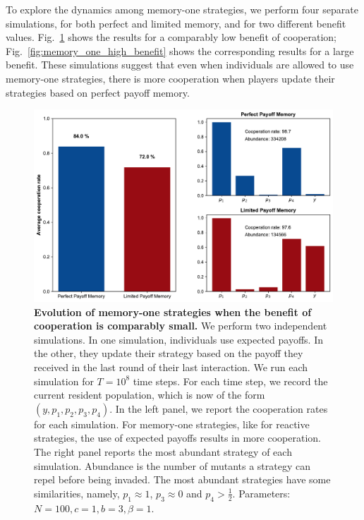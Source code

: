 \documentclass[11pt]{article}
\theoremstyle{plainCl1}
\theoremstyle{plainCl2}
\begin{document}
To explore the dynamics among memory-one strategies, we perform four separate simulations, for both perfect and limited memory, and for two different benefit values. 
Fig.~\ref{fig:memory_one_low_benefit} shows the results for a comparably low benefit of cooperation; 
Fig.~\ref{fig:memory_one_high_benefit} shows the corresponding results for a large benefit. 
These simulations suggest that even when individuals
are allowed to use memory-one strategies, there is more cooperation when players update their strategies based on perfect payoff memory. 

\begin{figure}[!htbp]
  \centering 
  \includegraphics[width=\textwidth]{static/memory_one_results_low_benefit.pdf}
  \caption{\textbf{Evolution of memory-one strategies when the benefit of cooperation is comparably small.}
  We perform two independent simulations. In one simulation, individuals use
  expected payoffs. 
  In the other, they update their strategy based on the payoff they received in the last round of their last interaction. 
  We run each simulation for \(T = 10^8\) time steps.
  For each time step, we record the current resident population, which is
  now of the form  \((y, p_1, p_2, p_3, p_4)\). In the left panel, we report the
  cooperation rates for each simulation. 
  For memory-one strategies, like for reactive strategies, the use of expected payoffs results in more cooperation. 
  The right panel reports the most abundant strategy of each
  simulation. Abundance is the number of mutants a strategy can repel before
  being invaded. The most abundant strategies have some similarities,
  namely, \(p_1 \approx 1\), \(p_3 \approx 0\) and \(p_4 > \frac{1}{2}\). 
  Parameters: \(N =100, c=1, b=3, \beta=1\).}\label{fig:memory_one_low_benefit}
\end{figure}
\end{document}

